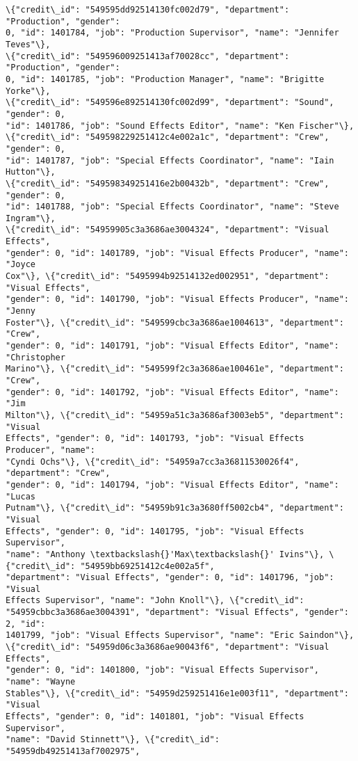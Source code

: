 \documentclass[11pt]{article}
\begin{document}
\begin{tcolorbox}[breakable, size=fbox, boxrule=.5pt, pad at break*=1mm, opacityfill=0]
\begin{Verbatim}[commandchars=\\\{\}]
\{"credit\_id": "549595dd92514130fc002d79", "department": "Production", "gender":
0, "id": 1401784, "job": "Production Supervisor", "name": "Jennifer Teves"\},
\{"credit\_id": "549596009251413af70028cc", "department": "Production", "gender":
0, "id": 1401785, "job": "Production Manager", "name": "Brigitte Yorke"\},
\{"credit\_id": "549596e892514130fc002d99", "department": "Sound", "gender": 0,
"id": 1401786, "job": "Sound Effects Editor", "name": "Ken Fischer"\},
\{"credit\_id": "549598229251412c4e002a1c", "department": "Crew", "gender": 0,
"id": 1401787, "job": "Special Effects Coordinator", "name": "Iain Hutton"\},
\{"credit\_id": "549598349251416e2b00432b", "department": "Crew", "gender": 0,
"id": 1401788, "job": "Special Effects Coordinator", "name": "Steve Ingram"\},
\{"credit\_id": "54959905c3a3686ae3004324", "department": "Visual Effects",
"gender": 0, "id": 1401789, "job": "Visual Effects Producer", "name": "Joyce
Cox"\}, \{"credit\_id": "5495994b92514132ed002951", "department": "Visual Effects",
"gender": 0, "id": 1401790, "job": "Visual Effects Producer", "name": "Jenny
Foster"\}, \{"credit\_id": "549599cbc3a3686ae1004613", "department": "Crew",
"gender": 0, "id": 1401791, "job": "Visual Effects Editor", "name": "Christopher
Marino"\}, \{"credit\_id": "549599f2c3a3686ae100461e", "department": "Crew",
"gender": 0, "id": 1401792, "job": "Visual Effects Editor", "name": "Jim
Milton"\}, \{"credit\_id": "54959a51c3a3686af3003eb5", "department": "Visual
Effects", "gender": 0, "id": 1401793, "job": "Visual Effects Producer", "name":
"Cyndi Ochs"\}, \{"credit\_id": "54959a7cc3a36811530026f4", "department": "Crew",
"gender": 0, "id": 1401794, "job": "Visual Effects Editor", "name": "Lucas
Putnam"\}, \{"credit\_id": "54959b91c3a3680ff5002cb4", "department": "Visual
Effects", "gender": 0, "id": 1401795, "job": "Visual Effects Supervisor",
"name": "Anthony \textbackslash{}'Max\textbackslash{}' Ivins"\}, \{"credit\_id": "54959bb69251412c4e002a5f",
"department": "Visual Effects", "gender": 0, "id": 1401796, "job": "Visual
Effects Supervisor", "name": "John Knoll"\}, \{"credit\_id":
"54959cbbc3a3686ae3004391", "department": "Visual Effects", "gender": 2, "id":
1401799, "job": "Visual Effects Supervisor", "name": "Eric Saindon"\},
\{"credit\_id": "54959d06c3a3686ae90043f6", "department": "Visual Effects",
"gender": 0, "id": 1401800, "job": "Visual Effects Supervisor", "name": "Wayne
Stables"\}, \{"credit\_id": "54959d259251416e1e003f11", "department": "Visual
Effects", "gender": 0, "id": 1401801, "job": "Visual Effects Supervisor",
"name": "David Stinnett"\}, \{"credit\_id": "54959db49251413af7002975",

\end{Verbatim}
\end{tcolorbox}
\end{document}
